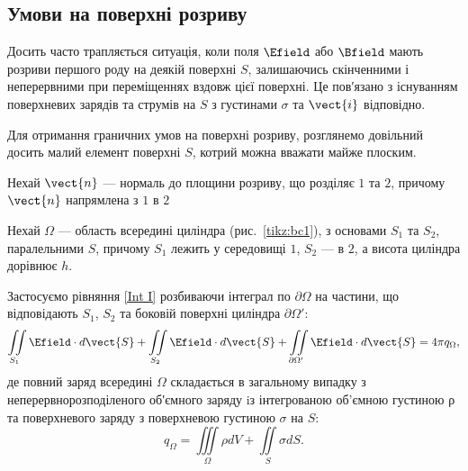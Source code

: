 \subsection*{Умови на поверхні розриву}


Досить часто трапляється ситуація, коли поля $\Efield$ або $\Bfield$ мають розриви
першого роду на деякій поверхні $S$, залишаючись скінченними і неперервними
при переміщеннях вздовж цієї поверхні. Це пов′язано з існуванням
поверхневих зарядів та струмів на $S$ з густинами $\sigma$ та $\vect{i}$ відповідно.

Для отримання граничних умов на поверхні розриву, розглянемо довільний
досить малий елемент поверхні $S$, котрий можна вважати майже плоским.

Нехай $\vect{n}$ --- нормаль до площини розриву, що розділяє $1$ та $2$, причому
$\vect{n}$ напрямлена з $1$ в $2$

\begin{SCfigure}[0.5][h!]
	\centering
	\caption{До виведення першої граничної умови}%
	\label{tikz:bc1}
\end{SCfigure}

Нехай $\Omega$ --- область всередині циліндра
(рис.~\ref{tikz:bc1}), з основами $S_1$ та $S_2$,
паралельними $S$, причому $S_1$ лежить у
середовищі $1$, $S_2$ --- в $2$, а висота циліндра дорівнює $h$.

Застосуємо рівняння \eqref{Int I} розбиваючи інтеграл по $\partial\Omega$ на частини, що відповідають $S_1$, $S_2$ та боковій поверхні
циліндра $\partial\Omega'$:
\begin{equation*}
    	\iint\limits_{S_1} \Efield\cdot d\vect{S} +  \iint\limits_{S_2} \Efield\cdot d\vect{S} + \iint\limits_{\partial\Omega'} \Efield\cdot
    	d\vect{S} = 4\pi q_{\Omega},
\end{equation*}
де повний заряд всередині $\Omega$ складається в загальному випадку з неперервнорозподіленого об′ємного заряду iз інтегрованою об’ємною
густиною ρ та поверхневого заряду з поверхневою густиною $\sigma$ на $S$:
\begin{equation*}
    q_{\Omega} = \iiint\limits_{\Omega} \rho dV + \iint\limits_S \sigma dS.
\end{equation*}


